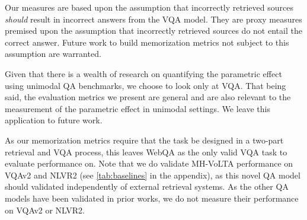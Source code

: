 Our measures are based upon the assumption that incorrectly retrieved sources \textit{should} result in incorrect answers from the VQA model. They are proxy measures premised upon the assumption that incorrectly retrieved sources do not entail the correct answer. Future work to build memorization metrics not subject to this assumption are warranted.

Given that there is a wealth of research on quantifying the parametric effect using unimodal QA benchmarks, we choose to look only at VQA. That being said, the evaluation metrics we present are general and are also relevant to the measurement of the parametric effect in unimodal settings. We leave this application to future work.

As our memorization metrics require that the task be designed in a two-part retrieval and VQA process, this leaves WebQA as the only valid VQA task to evaluate performance on. Note that we do validate MH-VoLTA performance on VQAv2 and NLVR2 (see \autoref{tab:baselines} in the appendix), as this novel QA model should validated independently of external retrieval systems. As the other QA models have been validated in prior works, we do not measure their performance on VQAv2 or NLVR2.






